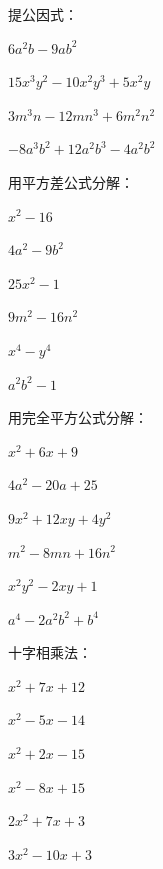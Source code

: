 \documentclass[a4paper,12pt]{ctexart}
\begin{document}
\begin{exercise}
\item 提公因式：
  \begin{subexercise}
    \item $6a^2b-9ab^2$
    \item $15x^3y^2-10x^2y^3+5x^2y$
    \item $3m^3n-12mn^3+6m^2n^2$
    \item $-8a^3b^2+12a^2b^3-4a^2b^2$
  \end{subexercise}

\item 用平方差公式分解：
  \begin{subexercise}
    \item $x^2-16$
    \item $4a^2-9b^2$
    \item $25x^2-1$
    \item $9m^2-16n^2$
    \item $x^4-y^4$
    \item $a^2b^2-1$
  \end{subexercise}

\item 用完全平方公式分解：
  \begin{subexercise}
    \item $x^2+6x+9$
    \item $4a^2-20a+25$
    \item $9x^2+12xy+4y^2$
    \item $m^2-8mn+16n^2$
    \item $x^2y^2-2xy+1$
    \item $a^4-2a^2b^2+b^4$
  \end{subexercise}

\item 十字相乘法：
  \begin{subexercise}
    \item $x^2+7x+12$
    \item $x^2-5x-14$
    \item $x^2+2x-15$
    \item $x^2-8x+15$
    \item $2x^2+7x+3$
    \item $3x^2-10x+3$
  \end{subexercise}
\end{exercise}

\newpage

\end{document}
